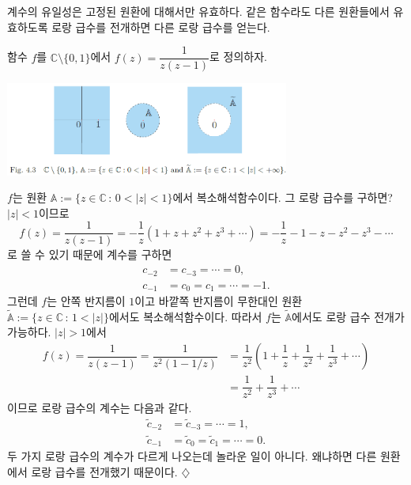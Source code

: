 계수의 유일성은 고정된 원환에 대해서만 유효하다.
같은 함수라도 다른 원환들에서 유효하도록 로랑 급수를 전개하면
다른 로랑 급수를 얻는다.

\begin{saltexample}[label=example-4-12]{}{}

함수 $f$를 $\mathbb C\setminus\{0,1\}$에서
$f(z) = \dfrac1{z(z-1)}$로 정의하자. 

\begin{center}
\includegraphics[width=0.7\textwidth]{./SaltChapter/fig-4-3}
\end{center}
\label{fig-4-3}
$f$는 원환 $\mathbb A:=\{ z\in \mathbb C\,:\, 0<|z|<1 \}$에서
복소해석함수이다. 그 로랑 급수를 구하면?
$|z|<1$이므로
\[
f(z) = \dfrac1{z(z-1)} %
= - \dfrac1z \left(1+z+z^2+ z^3 + \cdots \right)
= -\dfrac1z -1 -z -z^2 -z^3 - \cdots
\]
로 쓸 수 있기 때문에
계수를 구하면
\begin{align*}
c_{-2} &= c_{-3} = \cdots = 0, \\
c_{-1} & = c_0 = c_1 = \cdots = -1.
\end{align*}
그런데 $f$는 안쪽 반지름이 $1$이고 바깥쪽 반지름이 무한대인
원환 $\tilde{\mathbb A}:=\{ z\in \mathbb C\,:\, 1<|z| \}$에서도
복소해석함수이다. 따라서
$f$는 $\tilde{\mathbb A}$에서도 로랑 급수 전개가 가능하다.
$|z|>1$에서
\begin{align*}
f(z) = \dfrac1{z(z-1)} = \dfrac1{z^2(1-1/z)}
&= \dfrac1{z^2} \left( 1+ \dfrac1z + \dfrac1{z^2} + \dfrac1{z^3} + \cdots \right) \\
&= \dfrac 1{z^2} + \dfrac1{z^3} + \cdots
\end{align*}
이므로 로랑 급수의 계수는 다음과 같다.
\begin{align*}
\tilde c_{-2} &= \tilde c_{-3} = \cdots = 1, \\
\tilde c_{-1} & = \tilde c_0 = \tilde c_1 = \cdots = 0.
\end{align*}
두 가지 로랑 급수의 계수가 다르게 나오는데 놀라운 일이 아니다.
왜냐하면 다른 원환에서 로랑 급수를 전개했기 때문이다.
\hfill $\diamondsuit$
\end{saltexample}

